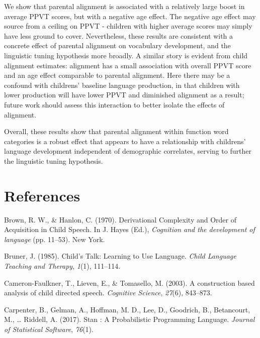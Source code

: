 \documentclass[10pt, letterpaper]{article}
\begin{document}
We show that parental alignment is associated with a relatively large
boost in average PPVT scores, but with a negative age effect. The
negative age effect may source from a ceiling on PPVT - children with
higher average scores may simply have less ground to cover.
Nevertheless, these results are consistent with a concrete effect of
parental alignment on vocabulary development, and the linguistic tuning
hypothesis more broadly. A similar story is evident from child alignment
estimates: alignment has a small association with overall PPVT score and
an age effect comparable to parental alignment. Here there may be a
confound with childrens' baseline language production, in that children
with lower production will have lower PPVT and diminished alignment as a
result; future work should assess this interaction to better isolate the
effects of alignment.

Overall, these results show that parental alignment within function word
categories is a robust effect that appears to have a relationship with
childrens' language development independent of demographic correlates,
serving to further the linguistic tuning hypothesis.

\hypertarget{references}{%
\section{References}\label{references}}

\setlength{\parindent}{-0.1in} 
\setlength{\leftskip}{0.125in}

\noindent

\hypertarget{refs}{}
\leavevmode\hypertarget{ref-Brown:1970wd}{}%
Brown, R. W., \& Hanlon, C. (1970). Derivational Complexity and Order of
Acquisition in Child Speech. In J. Hayes (Ed.), \emph{Cognition and the
development of language} (pp. 11--53). New York.

\leavevmode\hypertarget{ref-Bruner:1985if}{}%
Bruner, J. (1985). Child's Talk: Learning to Use Language. \emph{Child
Language Teaching and Therapy}, \emph{1}(1), 111--114.

\leavevmode\hypertarget{ref-CameronFaulkner:2003ge}{}%
Cameron-Faulkner, T., Lieven, E., \& Tomasello, M. (2003). A
construction based analysis of child directed speech. \emph{Cognitive
Science}, \emph{27}(6), 843--873.

\leavevmode\hypertarget{ref-Carpenter:2017ke}{}%
Carpenter, B., Gelman, A., Hoffman, M. D., Lee, D., Goodrich, B.,
Betancourt, M., \ldots{} Riddell, A. (2017). Stan : A Probabilistic
Programming Language. \emph{Journal of Statistical Software},
\emph{76}(1).
\end{document}
